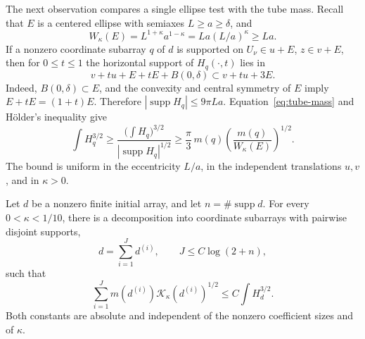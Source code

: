 The next observation compares a single ellipse test with the tube mass.
Recall that \(E\) is a centered ellipse with semiaxes
\(L\ge a\ge\delta\), and
\[
 W_\kappa(E)=L^{1+\kappa}a^{1-\kappa}
            =La(L/a)^\kappa\ge La.
\]
If a nonzero coordinate subarray \(q\) of \(d\) is supported on
\(U_\nu\in u+E\), \(z\in v+E\), then for \(0\le t\le1\)
the horizontal support of \(H_q(\cdot,t)\) lies in
\[
 v+tu+E+tE+B(0,\delta)\subset v+tu+3E.
\]
Indeed, \(B(0,\delta)\subset E\), and the convexity and central
symmetry of \(E\) imply \(E+tE=(1+t)E\). Therefore
\(|\operatorname{supp}H_q|\le9\pi La\). Equation~\eqref{eq:tube-mass}
and H\"older's inequality give
\begin{equation}\label{eq:bundle-lower}
 \int H_q^{3/2}
 \ge \frac{\big(\int H_q\big)^{3/2}}
              {|\operatorname{supp}H_q|^{1/2}}
 \ge \frac{\pi}{3}\,
              m(q)\left(\frac{m(q)}{W_\kappa(E)}\right)^{1/2}.
\end{equation}
The bound is uniform in the eccentricity \(L/a\), in the independent
translations \(u,v\), and in \(\kappa>0\).

\begin{lemma}\label{lem:density}
Let \(d\) be a nonzero finite initial array, and let
\(n=\#\operatorname{supp}d\). For every \(0<\kappa<1/10\), there
is a decomposition into coordinate subarrays with pairwise disjoint
supports,
\[
 d=\sum_{i=1}^{J}d^{(i)},\qquad J\le C\log(2+n),
\]
such that
\begin{equation}\label{eq:density-cost}
 \sum_{i=1}^{J}m(d^{(i)})\mathcal K_\kappa(d^{(i)})^{1/2}
 \le C\int H_d^{3/2}.
\end{equation}
Both constants are absolute and independent of the nonzero coefficient
sizes and of \(\kappa\).
\end{lemma}

